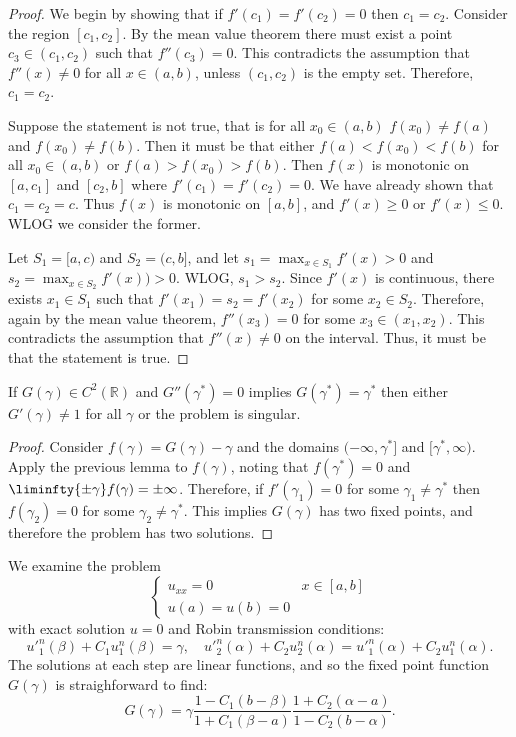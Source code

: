 \documentclass{article}
\begin{document}
\begin{proof}
We begin by showing that if $f'(c_1) = f'(c_2) = 0$ then $c_1 = c_2$.
Consider the region $[c_1,c_2]$.
By the mean value theorem there must exist a point $c_3 \in (c_1,c_2)$ such that $f''(c_3) = 0$.
This contradicts the assumption that $f''(x) \neq 0$ for all $x \in (a,b)$, unless $(c_1,c_2)$ is the empty set.
Therefore, $c_1 = c_2$.

Suppose the statement is not true, that is for all $x_0 \in (a,b)$ $f(x_0) \neq f(a)$ and $f(x_0) \neq f(b)$.
Then it must be that either $f(a) < f(x_0) < f(b)$ for all $x_0 \in (a,b)$ or $f(a) > f(x_0) > f(b)$.
Then $f(x)$ is monotonic on $[a,c_1]$ and $[c_2,b]$ where $f'(c_1) = f'(c_2) = 0$.
We have already shown that $c_1 = c_2 = c$.
Thus $f(x)$ is monotonic on $[a,b]$, and $f'(x) \geq 0$ or $f'(x) \leq 0$.
WLOG we consider the former.

Let $S_1 = [a,c)$ and $S_2 = (c,b]$, and let $s_1 = \max_{x \in S_1} f'(x) > 0$ and $s_2 = \max_{x \in S_2} f'(x)) > 0$.
WLOG, $s_1 > s_2$.
Since $f'(x)$ is continuous, there exists $x_1 \in S_1$ such that $f'(x_1) = s_2 = f'(x_2)$ for some $x_2 \in S_2$.
Therefore, again by the mean value theorem, $f''(x_3) = 0$ for some $x_3 \in (x_1,x_2)$.
This contradicts the assumption that $f''(x) \neq 0$ on the interval.
Thus, it must be that the statement is true.
\end{proof}

\begin{cor}
If $G(\gamma) \in C^2(\mathbb{R})$ and $G''(\gamma^*) = 0$ implies $G(\gamma^*) = \gamma^*$ then either $G'(\gamma) \neq 1$ for all $\gamma$ or the problem is singular.
\end{cor}

\begin{proof}
Consider $f(\gamma) = G(\gamma) - \gamma$ and the domains $(-\infty,\gamma^*]$ and $[\gamma^*,\infty)$.
Apply the previous lemma to $f(\gamma)$, noting that $f(\gamma^*) = 0$ and $\liminfty{\pm \gamma} f(\gamma) = \pm \infty$.
Therefore, if $f'(\gamma_1) = 0$ for some $\gamma_1 \neq \gamma^*$ then $f(\gamma_2) = 0$ for some $\gamma_2 \neq \gamma^*$.
This implies $G(\gamma)$ has two fixed points, and therefore the problem has two solutions.
\end{proof}

We examine the problem
\begin{equation*}
\begin{cases} u_{xx} = 0 & x \in [a,b] \\ u(a) = u(b) = 0 \end{cases}
\end{equation*}
with exact solution $u=0$ and Robin transmission conditions:
\begin{equation*}
u'^n_1(\beta) + C_1 u^n_1(\beta) = \gamma, \quad u'^n_2(\alpha) + C_2 u^n_2(\alpha) = u'^n_1(\alpha) + C_2 u^n_1(\alpha) .
\end{equation*}
The solutions at each step are linear functions, and so the fixed point function $G(\gamma)$ is straighforward to find:
\begin{equation*}
G(\gamma) = \gamma \frac{1 - C_1(b-\beta)}{1 + C_1(\beta-a)} \frac{1 + C_2(\alpha-a)}{1 - C_2(b - \alpha)} .
\end{equation*}
\end{document}
